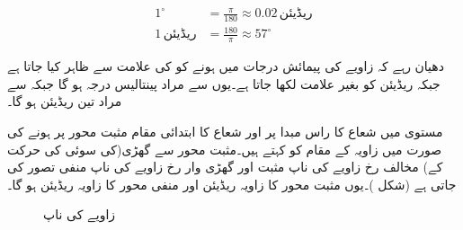 \begin{align*}
1^{\circ}&=\frac{\pi}{180}\approx 0.02 \,\text{ریڈیئن}\\
1\,\text{ریڈیئن}&=\frac{180}{\pi}\approx 57^{\circ}
\end{align*}

دھیان رہے کہ زاویے کی پیمائش درجات میں ہونے کو  کی علامت سے ظاہر کیا جاتا ہے جبکہ ریڈیئن کو بغیر علامت لکھا جاتا ہے۔یوں    سے مراد پینتالیس درجہ ہو گا جبکہ  سے مراد تین ریڈیئن ہو گا۔

مستوی   میں شعاع کا راس مبدا پر اور شعاع کا ابتدائی مقام مثبت محور  پر ہونے کی صورت میں زاویہ کے مقام کو   کہتے ہیں۔مثبت محور  سے گھڑی(کی  سوئی  کی حرکت کے)  مخالف رخ زاویے  کی ناپ مثبت اور گھڑی  وار  رخ  زاویے کی ناپ منفی تصور کی جاتی ہے (شکل )۔یوں مثبت محور  کا زاویہ  ریڈیئن اور منفی محور  کا زاویہ  ریڈیئن  ہو گا۔
\begin{figure}
\centering
{}
\caption{زاویے کی ناپ}
\label{شکل_ابتدا_زاویہ_کی_ناپ}
\end{figure}  

